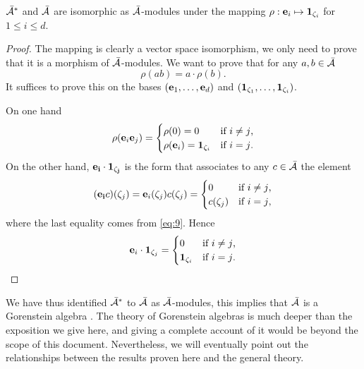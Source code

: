 \begin{proposition}
  \label{th:gorenstein}
  $\bar{\mathcal{A}}^\ast$ and $\bar{\mathcal{A}}$ are isomorphic as
  $\bar{\mathcal{A}}$-modules under the mapping
  $\rho:\mathbf{e}_i\mapsto\mathbf{1}_{\zeta_i}$ for $1\le i\le d$.
\end{proposition}
\begin{proof}
  The mapping is clearly a vector space isomorphism, we only need to
  prove that it is a morphism of $\bar{\mathcal{A}}$-modules. We want
  to prove that for any $a,b\in\bar{\mathcal{A}}$
  \[\rho(ab) = a\cdot\rho(b)\text{.}\]
  It suffices to prove this on the bases
  $(\mathbf{e}_1,\ldots,\mathbf{e}_d)$ and
  $(\mathbf{1}_{\zeta_1},\ldots,\mathbf{1}_{\zeta_i})$.

  On one hand
  \begin{equation}
    \label{eq:12}
    \rho(\mathbf{e}_i\mathbf{e}_j)=
    \begin{cases}
      \rho(0)=0 &\text{if $i\ne j$,}\\
      \rho(\mathbf{e}_i)=\mathbf{1}_{\zeta_i} &\text{if $i=j$.}
    \end{cases}
  \end{equation}
  On the other hand, $\mathbf{e_i}\cdot\mathbf{1_{\zeta_j}}$ is the form
  that associates to any $c\in\bar{\mathcal{A}}$ the element
  \begin{equation}
    \label{eq:13}
    (\mathbf{e_i}c)(\zeta_j) = \mathbf{e}_i(\zeta_j)c(\zeta_j) = 
    \begin{cases}
      0 &\text{if $i\ne j$,}\\
      c(\zeta_j) &\text{if $i=j$,}
    \end{cases}
  \end{equation}
  where the last equality comes from \eqref{eq:9}. Hence
  \begin{equation}
    \label{eq:14}
    \mathbf{e}_i\cdot\mathbf{1}_{\zeta_j}=
    \begin{cases}
      0 &\text{if $i\ne j$,}\\
      \mathbf{1}_{\zeta_i} &\text{if $i=j$.}
    \end{cases}
  \end{equation}
\end{proof}

\begin{nota}
  We have thus identified $\bar{\mathcal{A}}^\ast$ to
  $\bar{\mathcal{A}}$ as $\bar{\mathcal{A}}$-modules, this implies that
  $\bar{\mathcal{A}}$ is a Gorenstein algebra \cite[Chapter
  8]{mourrain+elkadi}. The theory of Gorenstein algebras is much
  deeper than the exposition we give here, and giving a complete
  account of it would be beyond the scope of this
  document. Nevertheless, we will eventually point out the
  relationships between the results proven here and the general
  theory.
\end{nota}

